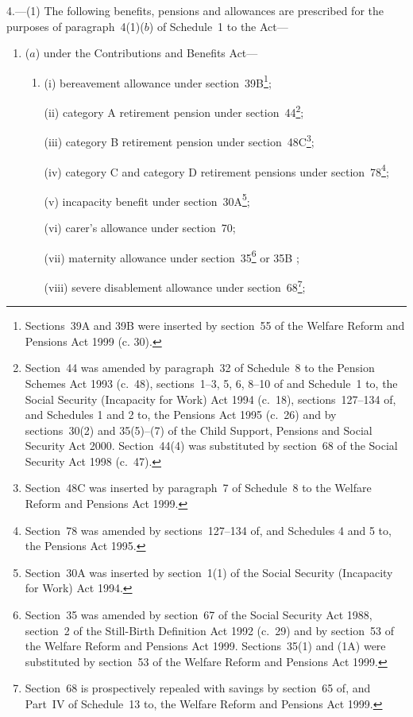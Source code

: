 \documentclass[12pt,a4paper]{article}
\begin{document}
4.---(1)  The following benefits, pensions and allowances are prescribed for the purposes of paragraph~4(1)($b$)  of Schedule~1 to the Act—
\begin{enumerate}\item[]
($a$) under the Contributions and Benefits Act—
\begin{enumerate}\item[]
(i) bereavement allowance under section~39B\footnote{\frenchspacing Sections~39A and 39B were inserted by section~55 of the Welfare Reform and Pensions Act 1999 (c. 30).};

(ii) category A retirement pension under section~44\footnote{Section~44 was amended by paragraph~32 of Schedule~8 to the Pension Schemes Act 1993 (c.\ 48), sections~1–3, 5, 6, 8–10 of and Schedule~1 to, the Social Security (Incapacity for Work) Act 1994 (c.\ 18), sections~127–134 of, and Schedules 1 and 2 to, the Pensions Act 1995 (c.\ 26) and by sections~30(2) and 35(5)–(7) of the Child Support, Pensions and Social Security Act 2000. Section~44(4) was substituted by section~68 of the Social Security Act 1998 (c.\ 47).};

(iii) category B retirement pension under section~48C\footnote{Section~48C was inserted by paragraph~7 of Schedule~8 to the Welfare Reform and Pensions Act 1999.};

(iv) category C and category D retirement pensions under section~78\footnote{Section~78 was amended by sections~127–134 of, and Schedules 4 and 5 to, the Pensions Act 1995.};

(v) incapacity benefit under section~30A\footnote{Section~30A was inserted by section~1(1) of the Social Security (Incapacity for Work) Act 1994.};

(vi) 
carer's allowance  %
under section~70;

(vii) maternity allowance under section~35\footnote{Section~35 was amended by section~67 of the Social Security Act 1988, section~2 of the Still-Birth Definition Act 1992 (c.\ 29) and by section~53 of the Welfare Reform and Pensions Act 1999. Sections~35(1) and (1A) were substituted by section~53 of the Welfare Reform and Pensions Act 1999.}
or 35B%
;

(viii) severe disablement allowance under section~68\footnote{Section~68 is prospectively repealed with savings by section~65 of, and Part~IV of Schedule~13 to, the Welfare Reform and Pensions Act 1999.};


\end{enumerate}
\end{enumerate}
\end{document}
